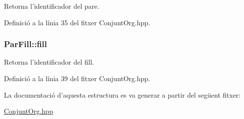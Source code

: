 Retorna l'identificador del pare. 



Definició a la línia 35 del fitxer Conjunt\-Org.\-hpp.

\hypertarget{struct_par_fill_af35c09c217a6bc97860535cc395ebc94}{
\subsubsection[{fill}]{\setlength{\rightskip}{0pt plus 5cm}Par\-Fill\-::fill}}\label{struct_par_fill_af35c09c217a6bc97860535cc395ebc94}


Retorna l'identificador del fill. 



Definició a la línia 39 del fitxer Conjunt\-Org.\-hpp.



La documentació d'aquesta estructura es va generar a partir del següent fitxer\-:\begin{DoxyCompactItemize}
\item 
\hyperlink{_conjunt_org_8hpp}{Conjunt\-Org.\-hpp}\end{DoxyCompactItemize}
